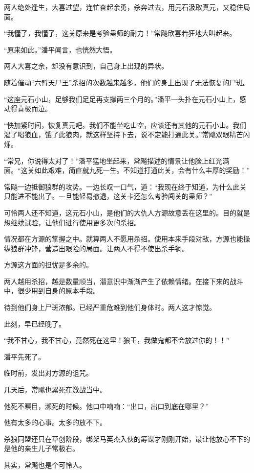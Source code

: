 \begin{this_body}
两人绝处逢生，大喜过望，连忙奋起余勇，杀奔过去，用元石汲取真元，又稳住局面。

“我懂了，我懂了，这关原来是考验蛊师的耐力！”常飚欣喜若狂地大叫起来。

“原来如此。”潘平闻言，也恍然大悟。

两人大喜之余，却没有意识到，自己身上出现的异状。

随着催动“六臂天尸王”杀招的次数越来越多，他们的身上出现了无法恢复的尸斑。

“这座元石小山，足够我们足足再支撑两三个月的。”潘平一头扑在元石小山上，感动得喜极而泣。

“快加紧时间，恢复真元吧。我们不能坐吃山空，应该还有其他的元石小山。我们渴了喝狼血，饿了此狼肉，就这样坚持下去，说不定能打通此关。”常飚双眼精芒闪烁。

“常兄，你说得太对了！”潘平猛地坐起来，常飚描述的情景让他脸上红光满面。“这关如此艰难，简直就九死一生。不知道打通此关，会有什么丰厚的奖励！”

常飚一边抵御狼群的攻势。一边长叹一口气，道：“我现在终于知道，为什么此关只能进不能出了。一旦能轻易撤退，这关卡还怎么考验闯关的蛊师？”

可怜两人还不知道，这元石小山，是他们的大仇人方源故意丢在这里的。目的就是想继续试验，让他们进行使用更多次的杀招。

情况都在方源的掌握之中。就算两人不愿用杀招。使用本来手段对敌，方源也能操纵狼群冲锋，营造出艰险的局面。让两人不得不使出杀手锏。

方源这方面的担忧是多余的。

两人越用杀招，越是数量顺当，潜意识中渐渐产生了依赖情绪。在接下来的战斗中，很少用到自身的原本手段。

待到他们身上尸斑浓郁。已经严重危难到他们身体时。两人这才惊觉。

此刻，早已经晚了。

“我不甘心，我不甘心，竟然死在这里！狼王，我做鬼都不会放过你的！！”

潘平先死了。

临时前，发出对方源的诅咒。

几天后，常飚也累死在激战当中。

他死不瞑目，濒死的时候。他口中喃喃：“出口，出口到底在哪里？”

他有太多的心事。太多的放不下。

杀狼同盟还只在草创阶段，绑架马英杰入伙的筹谋才刚刚开始，最让他放心不下的是他的亲生儿子常极右。

其实，常飚也是个可怜人。


\end{this_body}

